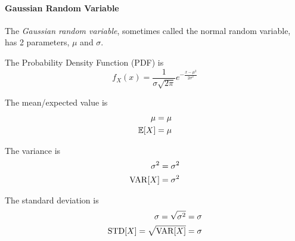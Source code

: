 \paragraph{Gaussian Random Variable}\label{par:Gaussian_Random_Variable}
\begin{definition}\label{def:Gaussian_Random_Variable}
  The \emph{Gaussian random variable}, sometimes called the normal random variable, has 2 parameters, $\mu$ and $\sigma$.

  The Probability Density Function (PDF) is
  \begin{equation}\label{eq:Gaussian_Random_Variable-PDF}
    f_{X}(x) = \frac{1}{\sigma \sqrt{2 \pi}} e^{- \frac{{x-\mu}^{2}}{2 \sigma^{2}}}
  \end{equation}

  The mean/expected value is
  \begin{equation}\label{eq:Gaussian_Random_Variable-Expected_Value}
    \begin{aligned}
      \mu &= \mu \\
      \operatorname{\operatorname{\mathbb{E}}}[X] &= \mu \\
    \end{aligned}
  \end{equation}

  The variance is
  \begin{equation}\label{eq:Gaussian_Random_Variable-Variance}
    \begin{aligned}
      \sigma^{2} &= \sigma^{2} \\
      \operatorname{\operatorname{VAR}}[X] &= \sigma^{2} \\
    \end{aligned}
  \end{equation}

  The standard deviation is
  \begin{equation}\label{eq:Gaussian_Random_Variable-Standard_Deviation}
    \begin{aligned}
      \sigma = \sqrt{\sigma^{2}} &= \sigma \\
      \operatorname{\operatorname{STD}}[X] = \sqrt{\operatorname{\operatorname{VAR}}[X]} &= \sigma \\
    \end{aligned}
  \end{equation}
\end{definition}

